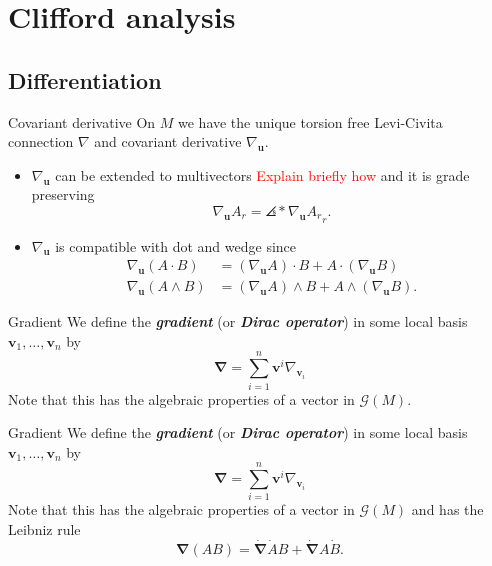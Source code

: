 \documentclass[aspectratio=169,handout]{beamer}
\newcommand\boldgreen[1]{\textcolor{lighter_csu_green}{\emph{\textbf{#1}}}}
\newcommand{\grad}{\boldsymbol{\nabla}}
\newcommand{\G}{\mathcal{G}}
\newcommand{\blade}[1]{\boldsymbol{#1}}
\DeclarePairedDelimiter\angles{\langle}{\rangle}
\newcommand{\proj}[2]{\angles*{#2}_{#1}}
\begin{document}
\section{Clifford analysis}

\subsection{Differentiation}

\begin{frame}{Covariant derivative}
\vfill
    On $M$ we have the unique torsion free Levi-Civita connection $\nabla$ and covariant derivative $\nabla_{\blade{u}}$.
    \pause
    \begin{itemize}
        \item $\nabla_{\blade{u}}$ can be extended to multivectors \textcolor{red}{Explain briefly how} and it is grade preserving
        \[
        \nabla_{\blade{u}} A_r = \proj{r}{\nabla_{\blade{u}} A_r}.
        \]
    
        \item $\nabla_{\blade{u}}$ is compatible with dot and wedge since
        \begin{align*}
        \nabla_{\blade{u}}(A\cdot B) &= (\nabla_{\blade{u}} A)\cdot B + A \cdot (\nabla_{\blade{u}} B)\\
        \nabla_{\blade{u}}(A\wedge B) &= (\nabla_{\blade{u}} A) \wedge B + A \wedge (\nabla_{\blade{u}} B).
        \end{align*}
    \end{itemize}
\vfill
\end{frame}

\begin{frame}{Gradient}
\vfill
    We define the \boldgreen{gradient} (or \boldgreen{Dirac operator}) in some local basis $\blade{v}_1,\dots,\blade{v}_n$ by
    \[
    \grad = \sum_{i=1}^n \blade{v}^i \nabla_{\blade{v}_i}
    \]
    \pause
    Note that this has the algebraic properties of a vector in $\G(M)$.
\vfill
\end{frame}

\begin{frame}{Gradient}
\vfill
    We define the \boldgreen{gradient} (or \boldgreen{Dirac operator}) in some local basis $\blade{v}_1,\dots,\blade{v}_n$ by
    \[
    \grad = \sum_{i=1}^n \blade{v}^i \nabla_{\blade{v}_i}
    \]
    \pause
    Note that this has the algebraic properties of a vector in $\G(M)$ and has the Leibniz rule
    \[
    \grad(AB) = \dot{\grad}\dot{A}B + \dot{\grad}A\dot{B}.
    \]
\vfill
\end{frame}
\end{document}
